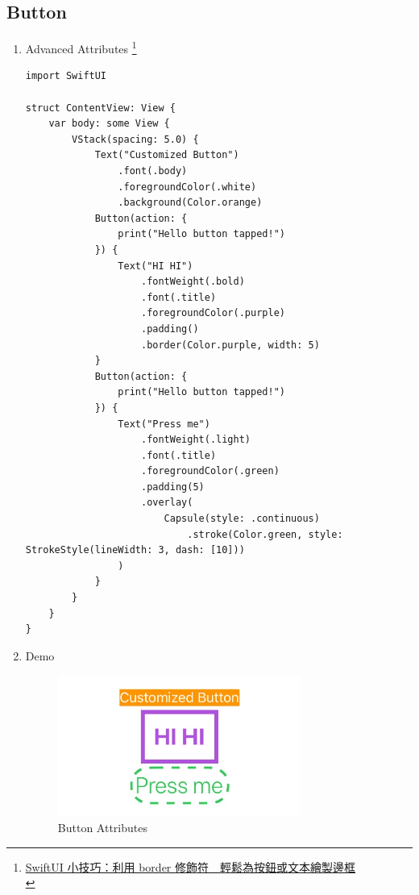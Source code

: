 \documentclass[a4paper,12pt]{article}
\begin{document}
\subsection{Button}
\label{sec:org972248d}
\begin{enumerate}
\item Advanced Attributes \footnote{\href{https://www.appcoda.com.tw/swiftui-border/}{SwiftUI 小技巧：利用 border 修飾符　輕鬆為按鈕或文本繪製邊框}\\}
\label{sec:org6cac3ea}
\lstset{breaklines=true,language=swift,label= ,caption= ,captionpos=b,firstnumber=1,numbers=left}
\begin{lstlisting}
import SwiftUI

struct ContentView: View {
    var body: some View {
        VStack(spacing: 5.0) {
            Text("Customized Button")
                .font(.body)
                .foregroundColor(.white)
                .background(Color.orange)
            Button(action: {
                print("Hello button tapped!")
            }) {
                Text("HI HI")
                    .fontWeight(.bold)
                    .font(.title)
                    .foregroundColor(.purple)
                    .padding()
                    .border(Color.purple, width: 5)
            }
            Button(action: {
                print("Hello button tapped!")
            }) {
                Text("Press me")
                    .fontWeight(.light)
                    .font(.title)
                    .foregroundColor(.green)
                    .padding(5)
                    .overlay(
                        Capsule(style: .continuous)
                            .stroke(Color.green, style: StrokeStyle(lineWidth: 3, dash: [10]))
                )
            }
        }
    }
}

\end{lstlisting}

\item Demo
\label{sec:org96017ad}
\begin{figure}[htbp]
\centering
\includegraphics[width=300]{images/customized-button-1.jpg}
\caption{\label{fig:Adv-Button-Attributes}Button Attributes}
\end{figure}
\end{enumerate}
\end{document}
